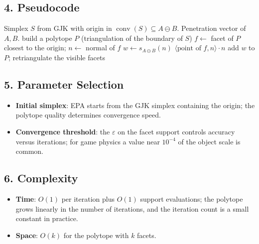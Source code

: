 \subsection{4. Pseudocode}

\begin{algorithm}[htbp]
\caption{Expanding Polytope Algorithm (Penetration Depth)}
\label{alg:convexint_epa}
\begin{algorithmic}[1]
\Require Simplex $S$ from GJK with origin in $\operatorname{conv}(S) \subseteq A \ominus B$.
\Ensure Penetration vector of $A, B$.
  \State build a polytope $P$ (triangulation of the boundary of $S$)
    \State $f \gets$ facet of $P$ closest to the origin; $n \gets$ normal of $f$
    \State $w \gets s_{A\ominus B}(n)$
      \State \Return $\langle \text{point of } f, n\rangle \cdot n$  
    \EndIf
    \State add $w$ to $P$; retriangulate the visible facets
  \EndWhile
\EndFunction
\end{algorithmic}
\end{algorithm}

\subsection{5. Parameter Selection}

\begin{itemize}
\item \textbf{Initial simplex}: EPA starts from the GJK simplex containing
  the origin; the polytope quality determines convergence speed.
\item \textbf{Convergence threshold}: the $\varepsilon$ on the facet
  support controls accuracy versus iterations; for game physics a value
  near $10^{-4}$ of the object scale is common.
\end{itemize}

\subsection{6. Complexity}

\begin{itemize}
\item \textbf{Time}: $O(1)$ per iteration plus $O(1)$ support evaluations;
  the polytope grows linearly in the number of iterations, and the
  iteration count is a small constant in practice.
\item \textbf{Space}: $O(k)$ for the polytope with $k$ facets.
\end{itemize}

